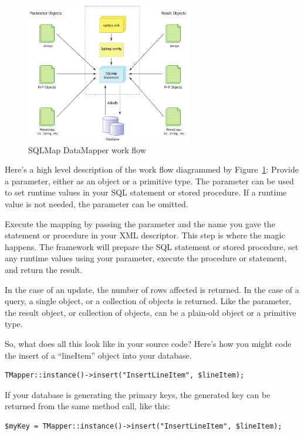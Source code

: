 \begin{figure}[!h]
    \centering
        \includegraphics[width=0.65\textwidth]{diagram}
    \caption{SQLMap DataMapper work flow}
    \label{fig:diagram}
\end{figure}

Here's a high level description of the work flow diagrammed by
Figure~\ref{fig:diagram}: Provide a parameter, either as an object or a
primitive type. The parameter can be used to set runtime values in your SQL
statement or stored procedure. If a runtime value is not needed, the parameter
can be omitted.

Execute the mapping by passing the parameter and the name you gave the
statement or procedure in your XML descriptor. This step is where the magic
happens. The framework will prepare the SQL statement or stored procedure, set
any runtime values using your parameter, execute the procedure or statement,
and return the result.

In the case of an update, the number of rows affected is returned. In the case
of a query, a single object, or a collection of objects is returned. Like the
parameter, the result object, or collection of objects, can be a plain-old
object or a primitive type.

So, what does all this look like in your source code? Here's how you might
code the insert of a ``lineItem'' object into your database.

\begin{verbatim}
TMapper::instance()->insert("InsertLineItem", $lineItem);
\end{verbatim}

If your database is generating the primary keys, the generated key can be
returned from the same method call, like this:

\begin{verbatim}
$myKey = TMapper::instance()->insert("InsertLineItem", $lineItem);
\end{verbatim}

